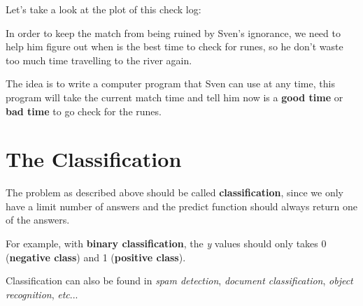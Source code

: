 \documentclass{article}
\begin{document}
\begin{flushleft}
Let's take a look at the plot of this check log:
\end{flushleft}

\begin{center}
\end{center}

\begin{flushleft}
In order to keep the match from being ruined by Sven's ignorance, we need to help him figure out when is the best time to check for runes, so he don't waste too much time travelling to the river again.
\end{flushleft}

\begin{flushleft}
The idea is to write a computer program that Sven can use at any time, this program will take the current match time and tell him now is a \textbf{good time} or \textbf{bad time} to go check for the runes.
\end{flushleft}

\section{The Classification}

\begin{flushleft}
The problem as described above should be called \textbf{classification}, since we only have a limit number of answers and the predict function should always return one of the answers.
\end{flushleft}

\begin{flushleft}
For example, with \textbf{binary classification}, the \textit{y} values should only takes 0 (\textbf{negative class}) and 1 (\textbf{positive class}).
\end{flushleft}

\begin{flushleft}
Classification can also be found in \textit{spam detection}, \textit{document classification}, \textit{object recognition}, \textit{etc}...
\end{flushleft}
\end{document}
